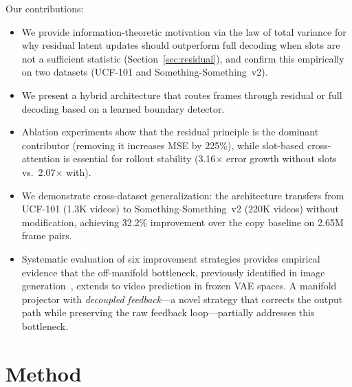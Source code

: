 \documentclass{article}
\begin{document}
\noindent Our contributions:
\begin{itemize}
\item We provide information-theoretic motivation via the law of total
  variance for why residual latent updates should outperform full
  decoding when slots are not a sufficient statistic
  (Section~\ref{sec:residual}), and confirm this empirically on two
  datasets (UCF-101 and Something-Something~v2).
\item We present a hybrid architecture that routes frames through
  residual or full decoding based on a learned boundary detector.
\item Ablation experiments show that the residual principle is the
  dominant contributor (removing it increases MSE by 225\%), while
  slot-based cross-attention is essential for rollout stability
  (3.16$\times$ error growth without slots vs.\ 2.07$\times$ with).
\item We demonstrate cross-dataset generalization: the architecture
  transfers from UCF-101 (1.3K videos) to Something-Something~v2
  (220K videos) without modification, achieving 32.2\% improvement over
  the copy baseline on 2.65M frame pairs.
\item Systematic evaluation of six improvement strategies provides
  empirical evidence that the off-manifold bottleneck, previously
  identified in image generation~\cite{zheng2025raedit}, extends to
  video prediction in frozen VAE spaces.
  A manifold projector with \emph{decoupled feedback}---a novel
  strategy that corrects the output path while preserving the raw
  feedback loop---partially addresses this bottleneck.
\end{itemize}

\section{Method}
\label{sec:method}
\end{document}
